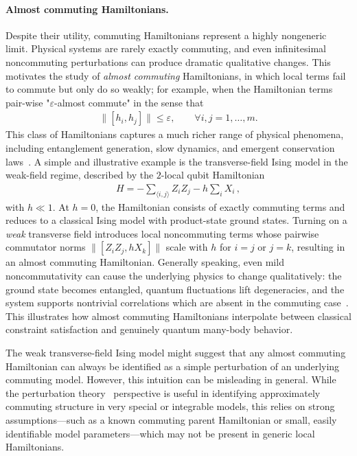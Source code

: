 \documentclass[a4paper,onecolumn,11pt]{quantumarticle}
\theoremstyle{plain}
\newcommand{\eps}{\varepsilon}
\begin{document}
\paragraph{Almost commuting Hamiltonians.}
Despite their utility, commuting Hamiltonians represent a highly nongeneric limit.  Physical systems are rarely exactly commuting, and even infinitesimal noncommuting perturbations can produce dramatic qualitative changes. 
 This motivates the study of \emph{almost commuting} Hamiltonians, in 
 which local terms fail to commute but only do so weakly; for example, when the Hamiltonian terms pair-wise "$\eps$-almost commute" in the sense that
\begin{align}
\|[h_i,h_j]\| \leq \eps, \quad\quad \forall i,j=1,\dots,m.   
\end{align}
This class of Hamiltonians captures a much richer range of physical phenomena, including 
entanglement generation, slow dynamics, and emergent conservation laws~\cite{Sachdev2011,Mbeng_2024}. 
A simple and illustrative example is the transverse-field Ising model 
in the weak-field regime, described by the $2$-local qubit Hamiltonian
\begin{align}\label{eq:ising}
H = -\sum_{\langle i,j \rangle} Z_i Z_j - h \sum_i X_i \, ,
\end{align}
with $h \ll 1$.  At $h=0$, the Hamiltonian consists of exactly 
commuting terms and reduces to a classical Ising model with 
product-state ground states.  Turning on a \emph{weak} transverse field 
introduces local noncommuting terms whose pairwise commutator norms 
$\|[Z_i Z_j,hX_k]\|$
scale with $h$ for $i=j$ or $j=k$, resulting in an almost commuting Hamiltonian. Generally speaking, even
mild noncommutativity can cause the underlying physics to 
change qualitatively: the ground state becomes entangled, quantum fluctuations lift degeneracies, and the system supports nontrivial correlations which are absent in the commuting case~\cite{Mbeng_2024}.  This illustrates how almost commuting Hamiltonians interpolate between classical constraint satisfaction and genuinely quantum many-body behavior.

The weak transverse-field Ising model might suggest that any almost commuting Hamiltonian can always be identified as a simple perturbation of an underlying commuting model. However, this intuition can be misleading in general. While the perturbation theory~\cite{Kato:1966:PTL} perspective is useful in identifying approximately commuting structure in very special or integrable models, this relies on strong assumptions---such as a known commuting parent Hamiltonian or small, easily identifiable model parameters---which may not be present in generic local Hamiltonians. 
\end{document}
